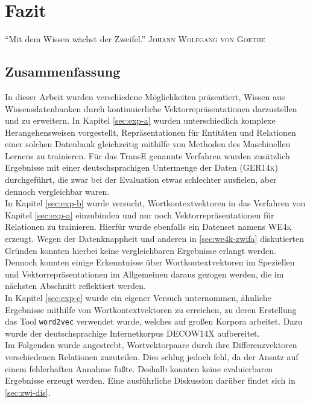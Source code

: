 
\chapter{Fazit} %

\label{Chapter6} %


\begin{itquote}
  ``Mit dem Wissen wächst der Zweifel.''
  \flushright
  \textsc{Johann Wolfgang von Goethe}
\end{itquote}

\section{Zusammenfassung}

In dieser Arbeit wurden verschiedene Möglichkeiten präsentiert, Wissen aus Wissensdatenbanken durch kontinuierliche Vektorrepräsentationen
darzustellen und zu erweitern. In Kapitel \ref{sec:exp-a} wurden unterschiedlich komplexe Herangehensweisen vorgestellt, Repräsentationen
für Entitäten und Relationen einer solchen Datenbank gleichzeitig mithilfe von Methoden des Maschinellen Lernens zu trainieren.
Für das TransE genannte Verfahren wurden zusätzlich Ergebnisse mit einer deutschsprachigen Untermenge der Daten (\textsc{GER14k})
durchgeführt, die zwar bei der Evaluation etwas schlechter ausfielen, aber dennoch vergleichbar waren.\\

In Kapitel \ref{sec:exp-b} wurde versucht, Wortkontextvektoren in das Verfahren von Kapitel \ref{sec:exp-a} einzubinden und nur
noch Vektorrepräsentationen für Relationen zu trainieren. Hierfür wurde ebenfalls ein Datenset namens \textsc{WE4k}
erzeugt. Wegen der Datenknappheit und anderen in \ref{sec:we4k-zwifa} diskutierten Gründen konnten hierbei keine vergleichbaren Ergebnisse
erlangt werden. Dennoch konnten einige Erkenntnisse über Wortkontextvektoren im Speziellen und Vektorrepräsentationen
im Allgemeinen daraus gezogen werden, die im nächsten Abschnitt reflektiert werden.\\

In Kapitel \ref{sec:exp-c} wurde ein eigener Versuch unternommen, ähnliche Ergebnisse mithilfe von Wortkontextvektoren
zu erreichen, zu deren Erstellung das Tool \verb|word2vec| verwendet wurde, welches auf großen Korpora arbeitet. Dazu
wurde der deutschsprachige Internetkorpus \textsc{DECOW14X} aufbereitet.\\
Im Folgenden wurde angestrebt, Wortvektorpaare durch ihre Differenzvektoren verschiedenen Relationen zuzuteilen. Dies schlug
jedoch fehl, da der Ansatz auf einem fehlerhaften Annahme fußte. Deshalb konnten keine evaluierbaren Ergebnisse erzeugt werden.
Eine ausführliche Diskussion darüber findet sich in \ref{sec:zwi-dis}.\\

